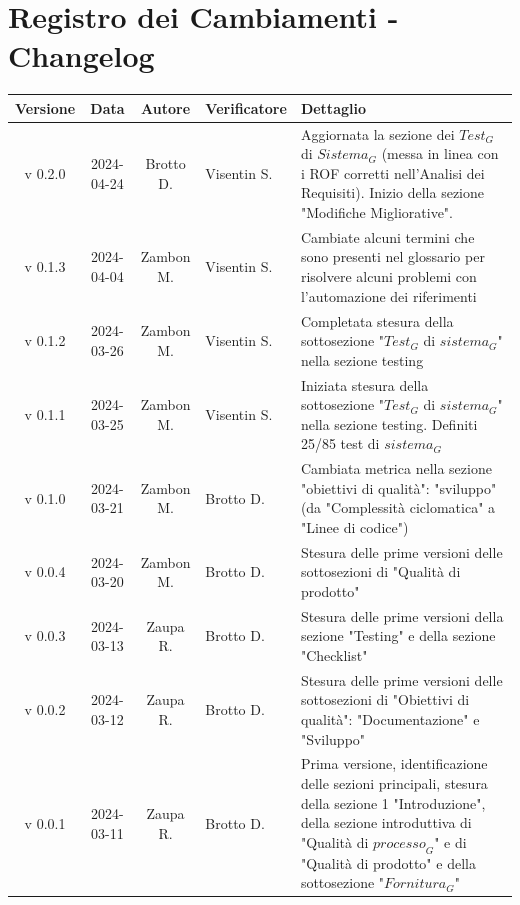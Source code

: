 \documentclass[12pt, oneside]{article}
\begin{document}
\section*{Registro dei Cambiamenti - Changelog}
\begin{tabular}{|c|c|c|p{3cm}|p{6cm}|}
\hline
\textbf{Versione} & \textbf{Data} & \textbf{Autore} & \textbf{Verificatore} & \textbf{Dettaglio} \\
\hline
v 0.2.0 & 2024-04-24 & Brotto D. & Visentin S. & Aggiornata la sezione dei $\textit{Test}_G$ di $\textit{Sistema}_G$ (messa in linea con i ROF corretti nell'Analisi dei Requisiti).
\newline
Inizio della sezione "Modifiche Migliorative".\\
\hline
v 0.1.3 & 2024-04-04 & Zambon M. & Visentin S. & Cambiate alcuni termini che sono presenti nel glossario per risolvere alcuni problemi con l'automazione dei riferimenti\\
\hline
v 0.1.2 & 2024-03-26 & Zambon M. & Visentin S. & Completata stesura della sottosezione "$\textit{Test}_G$ di $\textit{sistema}_G$" nella sezione testing\\
\hline
v 0.1.1 & 2024-03-25 & Zambon M. & Visentin S. & Iniziata stesura della sottosezione "$\textit{Test}_G$ di $\textit{sistema}_G$" nella sezione testing. Definiti 25/85 test di $\textit{sistema}_G$\\
\hline
v 0.1.0 & 2024-03-21 & Zambon M. & Brotto D. & Cambiata metrica nella sezione "obiettivi di qualità": "sviluppo" (da "Complessità ciclomatica" a "Linee di codice")\\
\hline
v 0.0.4 & 2024-03-20 & Zambon M. & Brotto D. & Stesura delle prime versioni delle sottosezioni di "Qualità di prodotto"\\
\hline
v 0.0.3 & 2024-03-13 & Zaupa R. & Brotto D. & Stesura delle prime versioni della sezione "Testing" e della sezione "Checklist"\\
\hline
v 0.0.2 & 2024-03-12 & Zaupa R. & Brotto D. & Stesura delle prime versioni delle sottosezioni di "Obiettivi di qualità": "Documentazione" e "Sviluppo"\\
\hline
v 0.0.1 & 2024-03-11 & Zaupa R. & Brotto D. & Prima versione, identificazione delle sezioni principali, stesura della sezione 1 "Introduzione", della sezione introduttiva di "Qualità di $\textit{processo}_G$" e di "Qualità di prodotto" e della sottosezione "$\textit{Fornitura}_G$" \\
\hline
\end{tabular}
\newpage


\tableofcontents
\newpage

\newpage

\newpage

\newpage

\newpage

\newpage

\end{document}

